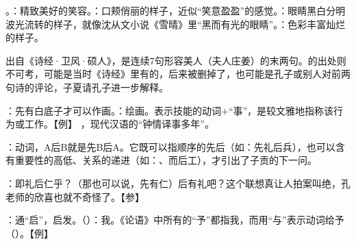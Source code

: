 {
\item {}。：精致美好的笑容。：口颊俏丽的样子，近似“笑意盈盈”的感觉。：眼睛黑白分明波光流转的样子，就像沈从文小说《雪晴》里“黑而有光的眼睛”。：色彩丰富灿烂的样子。 %

出自《诗经·卫风·硕人》，是连续7句形容美人（夫人庄姜）的末两句。的出处则不可考，可能是当时《诗经》里有的，后来被删掉了，也可能是孔子或别人对前两句诗的评论，子夏请孔子进一步解释。
\item {}：先有白底子才可以作画。：绘画。表示技能的动词+“事”，是较文雅地指称该行为或工作。【例】 ，现代汉语的“钟情译事多年”。

：动词，A后B就是先B后A。它既可以指顺序的先后（如：先礼后兵），也可以含有重要性的高低、关系的递进（如：、而后工），才引出了子贡的下一问。

\item {}：即礼后仁乎？（那也可以说，先有仁）后有礼吧？这个联想真让人拍案叫绝，孔老师的欣喜也就不奇怪了。【参】 
\item {}：通“启”，启发。（）：我。《论语》中所有的“予”都指我，而用“与”表示动词给予（）。【例】 
}
{}
%


